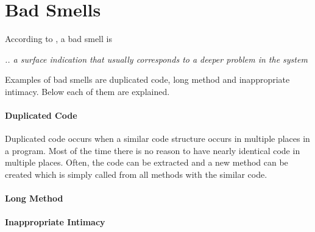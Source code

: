 \section{Bad Smells}
According to \citet{code:smell}, a bad smell is 
\begin{center}
\textit{.. a surface indication that usually corresponds to a deeper problem in the system}
\end{center}
Examples of bad smells are duplicated code, long method and inappropriate intimacy. Below each of them are explained. 

\paragraph{Duplicated Code}
Duplicated code occurs when a similar code structure occurs in multiple places in a program. Most of the time there is no reason to have nearly identical code in multiple places. Often, the code can be extracted and a new method can be created which is simply called from all methods with the similar code.
\paragraph{Long Method}
\paragraph{Inappropriate Intimacy}